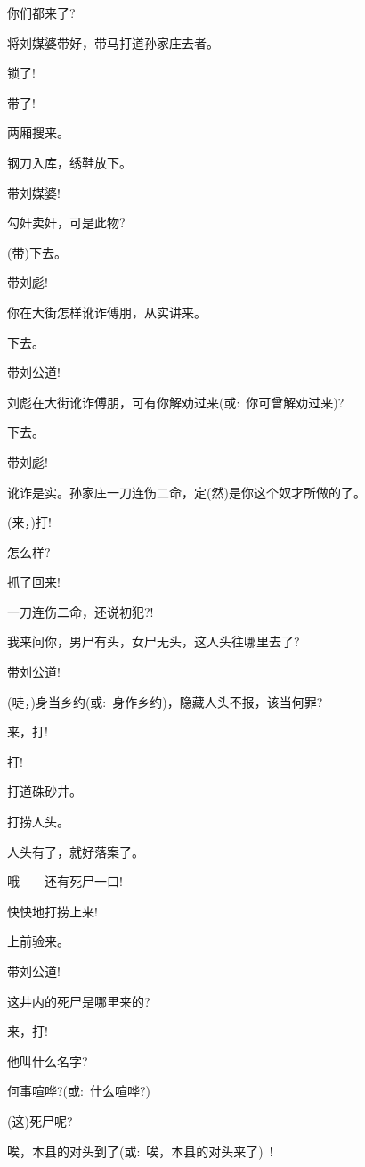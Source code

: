 {{你们都来了?}

{将刘媒婆带好，带马打道孙家庄去者。}

{\vspace{5pt}}

{锁了!}

{带了!}

{两厢搜来。}

{钢刀入库，绣鞋放下。}

{带刘媒婆!}

{勾奸卖奸，可是此物?}

{(带)下去。}

{带刘彪!}

{你在大街怎样讹诈傅朋，从实讲来。}

{下去。}

{带刘公道!}

{刘彪在大街讹诈傅朋，可有你解劝过来({\akai 或}:~你可曾解劝过来)?}

{下去。}

{带刘彪!}

{讹诈是实。孙家庄一刀连伤二命，定(然)是你这个奴才所做的了。}

{(来，)打!}

{怎么样?}

{抓了回来!}

{一刀连伤二命，还说初犯?!}

{我来问你，男尸有头，女尸无头，这人头往哪里去了?}

{带刘公道!}

{(唗，)身当乡约({\akai 或}:~身作乡约)，隐藏人头不报，该当何罪?}

{来，打!}

{打!}

{打道硃砂井。}

{打捞人头。}

{人头有了，就好落案了。}

{哦------还有死尸一口!}

{快快地打捞上来!}

{上前验来。}

{带刘公道!}

{这井内的死尸是哪里来的?}

{来，打!}

{他叫什么名字?}

{何事喧哗?({\akai 或}:~什么喧哗?)}

{(这)死尸呢?}

{唉，本县的对头到了({\akai 或}:~唉，本县的对头来了)~!}

}
